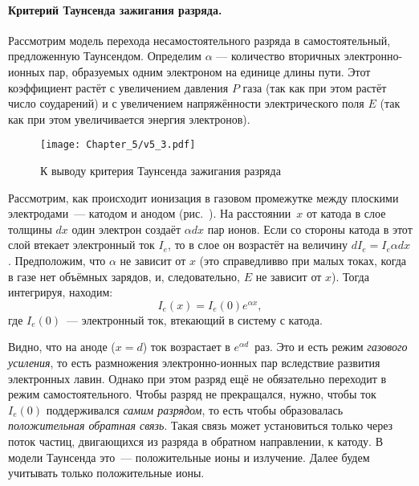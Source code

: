 \paragraph{Критерий Таунсенда зажигания разряда.}
Рассмотрим модель перехода несамостоятельного разряда в самостоятельный,
предложенную Таунсендом.
Определим  $\alpha$ ---
количество вторичных электронно-ионных пар, образуемых одним электроном
на единице длины пути.
Этот коэффициент растёт с увеличением давления $P$ газа
(так как при этом растёт число соударений)
и с увеличением напряжённости электрического поля $E$
(так как при этом увеличивается энергия электронов).

\begin{figure}[h!]
    \centering
    \texttt{[image: Chapter\_5/v5\_3.pdf]}
    \caption{К выводу критерия Таунсенда зажигания разряда}
\end{figure}

Рассмотрим, как происходит ионизация в газовом промежутке между плоскими
электродами~--- катодом и анодом (рис.~). На
расстоянии~$x$ от катода в слое толщины $dx$ один электрон создаёт $\alpha dx$
пар ионов. Если со стороны катода в этот
слой втекает электронный ток $I_e$, то в слое он возрастёт на величину
$dI_e=I_e\alpha dx$. Предположим, что $\alpha$ не зависит от $x$
(это справедливво при малых токах, когда в газе нет объёмных зарядов, и,
следовательно, $E$ не зависит от $x$).
Тогда интегрируя, находим:
\begin{equation*}
	I_e(x)=I_e(0)e^{\alpha x},
\end{equation*}
где $I_e(0)$~--- электронный ток, втекающий в систему с катода.

Видно, что на аноде ($x=d$) ток возрастает в $e^{\alpha d}$~раз.
Это и есть режим \emph{газового усиления}, то есть размножения
электронно-ионных пар вследствие развития
электронных лавин. Однако при этом разряд ещё не обязательно переходит в режим
самостоятельного. Чтобы разряд не прекращался, нужно,
чтобы ток $I_e(0)$ поддерживался \emph{самим разрядом},
то есть чтобы образовалась \emph{положительная обратная связь}.
Такая связь может установиться только через поток частиц, двигающихся
из разряда в обратном направлении, к катоду. В модели Таунсенда это~---
положительные ионы и излучение. Далее будем учитывать только положительные ионы.

